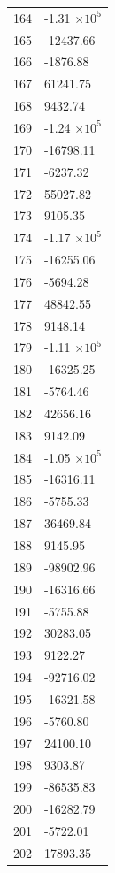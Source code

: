 \documentclass[a4paper,11pt]{article}
\begin{document}
\begin{center}
\begin{longtable}{|R{1.5cm}|R{2.6cm}|}
  164 &        -1.31 $\times 10^{           5}$ \\
  165 &    -12437.66 \\
  166 &     -1876.88 \\
  167 &     61241.75 \\
  168 &      9432.74 \\
  169 &        -1.24 $\times 10^{           5}$ \\
  170 &    -16798.11 \\
  171 &     -6237.32 \\
  172 &     55027.82 \\
  173 &      9105.35 \\
  174 &        -1.17 $\times 10^{           5}$ \\
  175 &    -16255.06 \\
  176 &     -5694.28 \\
  177 &     48842.55 \\
  178 &      9148.14 \\
  179 &        -1.11 $\times 10^{           5}$ \\
  180 &    -16325.25 \\
  181 &     -5764.46 \\
  182 &     42656.16 \\
  183 &      9142.09 \\
  184 &        -1.05 $\times 10^{           5}$ \\
  185 &    -16316.11 \\
  186 &     -5755.33 \\
  187 &     36469.84 \\
  188 &      9145.95 \\
  189 &    -98902.96 \\
  190 &    -16316.66 \\
  191 &     -5755.88 \\
  192 &     30283.05 \\
  193 &      9122.27 \\
  194 &    -92716.02 \\
  195 &    -16321.58 \\
  196 &     -5760.80 \\
  197 &     24100.10 \\
  198 &      9303.87 \\
  199 &    -86535.83 \\
  200 &    -16282.79 \\
  201 &     -5722.01 \\
  202 &     17893.35 \\

\end{longtable}
\end{center}
\end{document}
